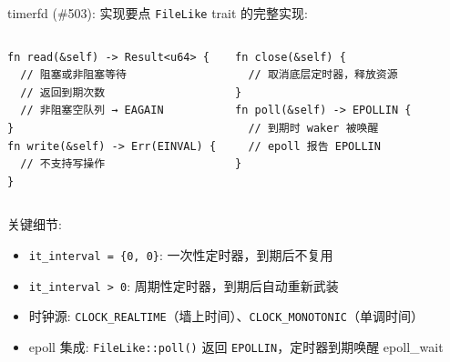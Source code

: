 \documentclass[aspectratio=169,10pt]{ctexbeamer}
\newcommand{\code}[1]{\texttt{#1}}
\begin{document}
\begin{frame}[fragile,shrink=5]{timerfd (\#503): 实现要点}
\code{FileLike} trait 的完整实现:

\begin{columns}[T]
\small
\begin{verbatim}
fn read(&self) -> Result<u64> {
  // 阻塞或非阻塞等待
  // 返回到期次数
  // 非阻塞空队列 → EAGAIN
}
fn write(&self) -> Err(EINVAL) {
  // 不支持写操作
}
\end{verbatim}

\small
\begin{verbatim}
fn close(&self) {
  // 取消底层定时器，释放资源
}
fn poll(&self) -> EPOLLIN {
  // 到期时 waker 被唤醒
  // epoll 报告 EPOLLIN
}
\end{verbatim}
\end{columns}

\vspace{1mm}
关键细节:
\begin{itemize}
  \item \texttt{it\_interval = \{0, 0\}}: 一次性定时器，到期后不复用
  \item \texttt{it\_interval > 0}: 周期性定时器，到期后自动重新武装
  \item 时钟源: \texttt{CLOCK\_REALTIME}（墙上时间）、\texttt{CLOCK\_MONOTONIC}（单调时间）
  \item epoll 集成: \code{FileLike::poll()} 返回 \texttt{EPOLLIN}，定时器到期唤醒 epoll\_wait
\end{itemize}
\end{frame}

\end{document}
